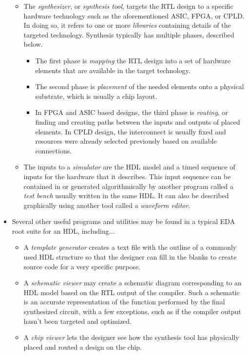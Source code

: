 \documentclass[10pt,a4paper]{article}
\begin{document}
\begin{itemize}
\begin{itemize}
\item The \textit{synthesizer}, or \textit{synthesis tool}, targets the RTL design to a specific hardware technology such as the aforementioned ASIC, FPGA, or CPLD. In doing so, it refers to one or more \textit{libraries} containing details of the targeted technology. Synthesis typically has multiple phases, described below.
\begin{itemize}
\item The first phase is \textit{mapping} the RTL design into a set of hardware elements that are available in the target technology.
\item The second phase is \textit{placement} of the needed elements onto a physical substrate, which is usually a chip layout. 
\item In FPGA and ASIC based designs, the third phase is \textit{routing}, or finding and creating paths between the inputs and outputs of placed elements. In CPLD design, the interconnect is usually fixed and resources were already selected previously based on available connections.
\end{itemize}
\item The inputs to a \textit{simulator} are the HDL model and a timed sequence of inputs for the hardware that it describes. This input sequence can be contained in or generated algorithmically by another program called a \textit{test bench} usually written in the same HDL. It can also be described graphically using another tool called a \textit{waveform editor}. 
\end{itemize}
\item Several other useful programs and utilities may be found in a typical EDA root suite for an HDL, including...
\begin{itemize}
\item A \textit{template generator} creates a text file with the outline of a commonly used HDL structure so that the designer can fill in the blanks to create source code for a very specific purpose.
\item A \textit{schematic viewer} may create a schematic diagram corresponding to an HDL model based on the RTL output of the compiler. Such a schematic is an accurate representation of the function performed by the final synthesized circuit, with a few exceptions, such as if the compiler output hasn't been targeted and optimized.
\item A \textit{chip viewer} lets the designer see how the synthesis tool has physically placed and routed a design on the chip.

\end{itemize}
\end{itemize}
\end{document}
